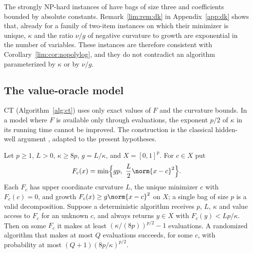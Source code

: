The strongly NP-hard instances of \cite[Theorem~3]{DelPiaKhajavirad2026}
have bags of size three and coefficients bounded by absolute constants.
Remark~\ref{lim:rem:dk} in Appendix~\ref{app:dk} shows that, already for a
family of two-item instances on which their minimizer is unique, $\kappa$ and
the ratio $\nu/g$ of negative curvature to growth are exponential in the
number of variables. These instances are therefore consistent with
Corollary~\ref{lim:cor:nopolylog}, and they do not contradict an algorithm
parameterized by $\kappa$ or by $\nu/g$.

\subsection{The value-oracle model}\label{sec:limits-oracle}

CT (Algorithm~\ref{alg:ct}) uses only exact values of $F$ and the curvature
bounds. In a model where $F$ is available only through evaluations, the
exponent $p/2$ of $\kappa$ in its running time cannot be improved. The
construction is the classical hidden-well argument
\cite{NemirovskiYudin1983}, adapted to the present hypotheses.

\begin{proposition}\label{lim:prop:oracle}
Let $p\ge1$, $L>0$, $\kappa\ge8p$, $g=L/\kappa$, and $X=[0,1]^p$. For
$c\in X$ put
\[
F_c(x)=\min\Bigl\{gp,\ \frac L2\norm{x-c}^2\Bigr\}.
\]
Each $F_c$ has upper coordinate curvature $L$, the unique minimizer $c$
with $F_c(c)=0$, and growth $F_c(x)\ge g\norm{x-c}^2$ on $X$; a single
bag of size $p$ is a valid decomposition. Suppose a deterministic algorithm
receives $p$, $L$, $\kappa$ and value access to $F_c$ for an unknown $c$,
and always returns $y\in X$ with $F_c(y)<Lp/\kappa$. Then on some $F_c$ it
makes at least $(\kappa/(8p))^{p/2}-1$ evaluations. A randomized algorithm
that makes at most $Q$ evaluations succeeds, for some $c$, with probability
at most $(Q+1)(8p/\kappa)^{p/2}$.
\end{proposition}

